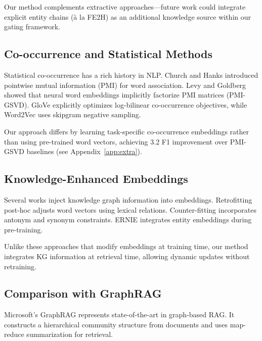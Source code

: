 \documentclass[10pt,twocolumn]{article}
\begin{document}
Our method complements extractive approaches---future work could integrate explicit entity chains (à la FE2H) as an additional knowledge source within our gating framework.

\subsection{Co-occurrence and Statistical Methods}
\label{sec:cooccur_related}

Statistical co-occurrence has a rich history in NLP. Church and Hanks \cite{church1990pmi} introduced pointwise mutual information (PMI) for word association. Levy and Goldberg \cite{levy2014neural} showed that neural word embeddings implicitly factorize PMI matrices (PMI-GSVD). GloVe \cite{pennington2014glove} explicitly optimizes log-bilinear co-occurrence objectives, while Word2Vec \cite{mikolov2013word2vec} uses skipgram negative sampling.

Our approach differs by learning task-specific co-occurrence embeddings rather than using pre-trained word vectors, achieving 3.2 F1 improvement over PMI-GSVD baselines (see Appendix~\ref{app:extra}).

\subsection{Knowledge-Enhanced Embeddings}
\label{sec:retrofit_related}

Several works inject knowledge graph information into embeddings. Retrofitting \cite{faruqui2015retrofitting} post-hoc adjusts word vectors using lexical relations. Counter-fitting \cite{mrksic2016counter} incorporates antonym and synonym constraints. ERNIE \cite{zhang2019ernie} integrates entity embeddings during pre-training.

Unlike these approaches that modify embeddings at training time, our method integrates KG information at retrieval time, allowing dynamic updates without retraining.

\subsection{Comparison with GraphRAG}
\label{sec:graphrag}

Microsoft's GraphRAG \cite{edge2024graphrag,microsoft2024graphrag} represents state-of-the-art in graph-based RAG. It constructs a hierarchical community structure from documents and uses map-reduce summarization for retrieval.
\end{document}
